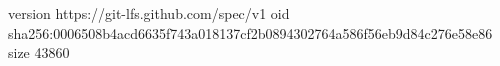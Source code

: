 version https://git-lfs.github.com/spec/v1
oid sha256:0006508b4acd6635f743a018137cf2b0894302764a586f56eb9d84c276e58e86
size 43860
